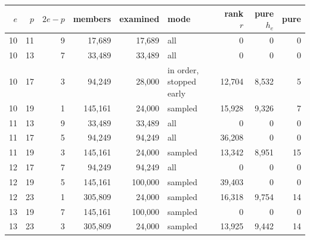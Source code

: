 \begin{tabular}{@{}rrrrrlrrr@{}}
\toprule
$e$ & $p$ & $2e-p$ & members & examined & mode & rank $r$ & pure $h_e$ & pure\\
\midrule
10 & 11 & 9 & 17{,}689 & 17{,}689 & all & 0 & 0 & 0\\
10 & 13 & 7 & 33{,}489 & 33{,}489 & all & 0 & 0 & 0\\
10 & 17 & 3 & 94{,}249 & 28{,}000 & in order, stopped early & 12{,}704 & 8{,}532 & 5\\
10 & 19 & 1 & 145{,}161 & 24{,}000 & sampled & 15{,}928 & 9{,}326 & 7\\
11 & 13 & 9 & 33{,}489 & 33{,}489 & all & 0 & 0 & 0\\
11 & 17 & 5 & 94{,}249 & 94{,}249 & all & 36{,}208 & 0 & 0\\
11 & 19 & 3 & 145{,}161 & 24{,}000 & sampled & 13{,}342 & 8{,}951 & 15\\
12 & 17 & 7 & 94{,}249 & 94{,}249 & all & 0 & 0 & 0\\
12 & 19 & 5 & 145{,}161 & 100{,}000 & sampled & 39{,}403 & 0 & 0\\
12 & 23 & 1 & 305{,}809 & 24{,}000 & sampled & 16{,}318 & 9{,}754 & 14\\
13 & 19 & 7 & 145{,}161 & 100{,}000 & sampled & 0 & 0 & 0\\
13 & 23 & 3 & 305{,}809 & 24{,}000 & sampled & 13{,}925 & 9{,}442 & 14\\
\bottomrule
\end{tabular}
